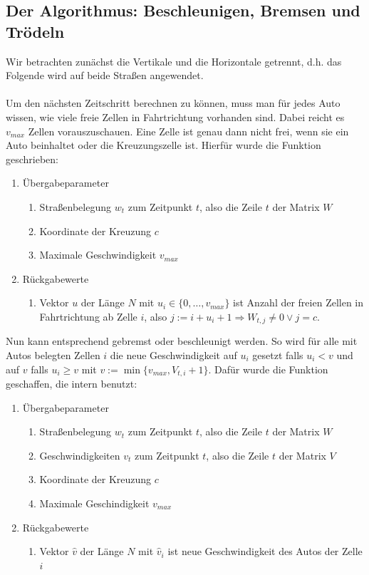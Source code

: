 \subsection{Der Algorithmus: Beschleunigen, Bremsen und Trödeln}
Wir betrachten zunächst die Vertikale und die Horizontale getrennt, d.h. das Folgende wird
auf beide Straßen angewendet.
\\ \\
Um den nächsten Zeitschritt berechnen zu können, muss man für jedes Auto wissen, wie viele freie Zellen 
in Fahrtrichtung vorhanden sind. Dabei reicht es \(v_{max}\) Zellen vorauszuschauen. 
Eine Zelle ist genau dann nicht frei, wenn sie ein Auto beinhaltet oder
die Kreuzungszelle ist. Hierfür wurde die Funktion  geschrieben:
\begin{enumerate}
  \item Übergabeparameter
    \begin{enumerate}
      \item Straßenbelegung \(w_t\) zum Zeitpunkt \(t\),  also die Zeile \(t\) der Matrix \(W\)       
      \item Koordinate der Kreuzung \(c\) 
      \item Maximale Geschwindigkeit \(v_{max}\)
    \end{enumerate}
  \item Rückgabewerte
    \begin{enumerate}
      \item Vektor \(u\) der Länge \(N\) mit \(u_i \in \{0, \ldots, v_{max} \}\) ist Anzahl der freien 
        Zellen in Fahrtrichtung ab Zelle \(i\), also \(j := i + u_i + 1 \Rightarrow W_{t,j} \neq 0 \lor j = c\).
    \end{enumerate}
\end{enumerate}
Nun kann entsprechend gebremst oder beschleunigt werden. So wird für alle mit Autos belegten Zellen \(i\)
die neue Geschwindigkeit auf \(u_i\) gesetzt falls \(u_i < v\) und auf \(v\) falls \(u_i \geq v\) mit
\( v := \min\{ v_{max}, V_{t,i}+1 \}\).  
Dafür wurde die Funktion  geschaffen, die intern  benutzt:
\begin{enumerate}
  \item Übergabeparameter
    \begin{enumerate}
      \item Straßenbelegung \(w_t\) zum Zeitpunkt \(t\),  also die Zeile \(t\) der Matrix \(W\)       
      \item Geschwindigkeiten \(v_t\) zum Zeitpunkt \(t\),  also die Zeile \(t\) der Matrix \(V\)       
      \item Koordinate der Kreuzung \(c\) 
      \item Maximale Geschindigkeit \(v_{max}\)
    \end{enumerate}
  \item Rückgabewerte
    \begin{enumerate}
      \item Vektor \(\hat{v}\) der Länge \(N\) mit \(\hat{v}_i\) ist neue Geschwindigkeit des Autos der Zelle \(i\)
    \end{enumerate}
\end{enumerate}
